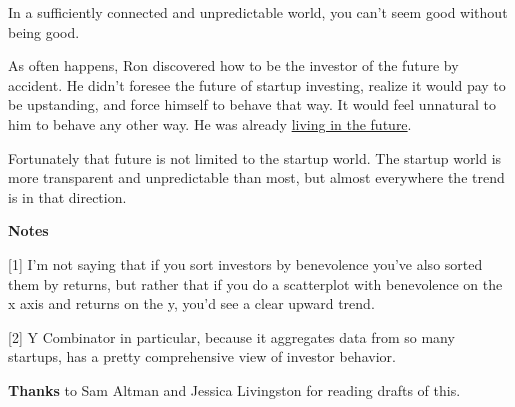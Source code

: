 In a sufficiently connected and unpredictable world, you can't seem good
without being good.

As often happens, Ron discovered how to be the investor of the future by
accident. He didn't foresee the future of startup investing, realize it
would pay to be upstanding, and force himself to behave that way. It
would feel unnatural to him to behave any other way. He was already
\href{startupideas.html}{living in the future}.

Fortunately that future is not limited to the startup world. The startup
world is more transparent and unpredictable than most, but almost
everywhere the trend is in that direction.

\textbf{Notes}

{[}1{]} I'm not saying that if you sort investors by benevolence you've
also sorted them by returns, but rather that if you do a scatterplot
with benevolence on the x axis and returns on the y, you'd see a clear
upward trend.

{[}2{]} Y Combinator in particular, because it aggregates data from so
many startups, has a pretty comprehensive view of investor behavior.

\textbf{Thanks} to Sam Altman and Jessica Livingston for reading drafts
of this.
